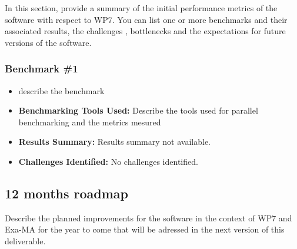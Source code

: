 In this section, provide a summary of the initial performance metrics of the software with respect to WP7.
You can list one or more benchmarks and their associated results, the challenges , bottlenecks and the expectations for future versions of the software.



\subsubsection{Benchmark \#1}
\begin{itemize}
    \item describe the benchmark
    \item \textbf{Benchmarking Tools Used:} Describe the tools used for parallel benchmarking and the metrics mesured
    \item \textbf{Results Summary:} Results summary not available.
    \item \textbf{Challenges Identified:} No challenges identified.
\end{itemize}

\subsection{12 months roadmap}
\label{sec:WP7:Arcane Framework:roadmap}

Describe the planned improvements  for the software in the context of WP7 and Exa-MA for the year to come that will be adressed in the next version of this deliverable.